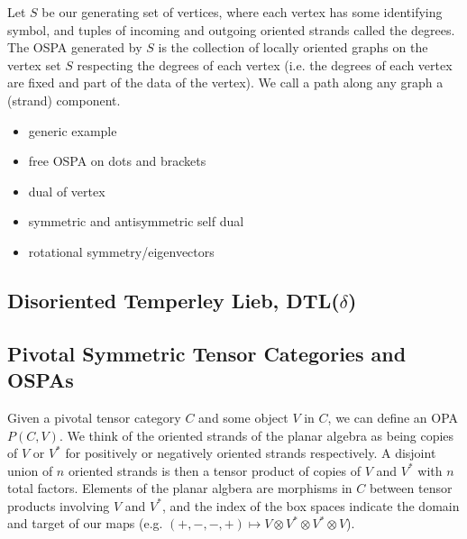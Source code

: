 \documentclass[11pt]{article} %
\begin{document}
\begin{mydef}
Let $S$ be our generating set of vertices, where each vertex has some identifying symbol, and tuples of incoming and outgoing oriented strands called the degrees. The OSPA generated by $S$ is the collection of locally oriented graphs on the vertex set $S$ respecting the degrees of each vertex (i.e. the degrees of each vertex are fixed and part of the data of the vertex). We call a path along any graph a (strand) component. 

\end{mydef}

\begin{itemize}
\item generic example
\item free OSPA on dots and brackets
\item dual of vertex
\item symmetric and antisymmetric self dual
\item rotational symmetry/eigenvectors
\end{itemize}



\subsection{Disoriented Temperley Lieb, DTL($\delta$)}



\subsection{Pivotal Symmetric Tensor Categories and OSPAs}

Given a pivotal tensor category $C$ and some object $V$ in $C$, we can define an OPA $P(C,V)$. We think of the oriented strands of the planar algebra as being copies of $V$ or $V^*$ for positively or negatively oriented strands respectively. A disjoint union of $n$ oriented strands is then a tensor product of copies of $V$ and $V^*$ with $n$ total factors. Elements of the planar algbera are morphisms in $C$ between tensor products involving $V$ and $V^*$, and the index of the box spaces indicate the domain and target of our maps (e.g. $(+,-,-,+) \mapsto V \otimes V^* \otimes V^* \otimes V$).
\end{document}
